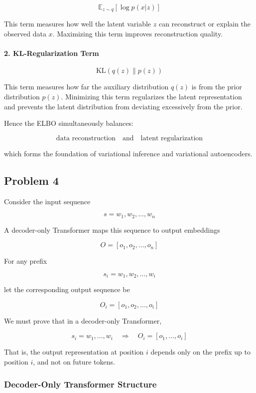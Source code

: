 \documentclass[12pt]{article}
\begin{document}
\[
\mathbb E_{z\sim q}[\log p(x|z)]
\]

This term measures how well the latent variable \(z\) can reconstruct or explain the observed data \(x\).
Maximizing this term improves reconstruction quality.

\paragraph{2. KL-Regularization Term}

\[
\mathrm{KL}(q(z)\|p(z))
\]

This term measures how far the auxiliary distribution \(q(z)\) is from the prior distribution \(p(z)\).
Minimizing this term regularizes the latent representation and prevents the latent distribution from deviating excessively from the prior.

Hence the ELBO simultaneously balances:

\[
\text{data reconstruction}
\quad \text{and} \quad
\text{latent regularization}
\]

which forms the foundation of variational inference and variational autoencoders.

\subsection*{Problem 4}

Consider the input sequence

\[
s = w_1,w_2,\dots,w_n
\]

A decoder-only Transformer maps this sequence to output embeddings

\[
O = [o_1,o_2,\dots,o_n]
\]

For any prefix

\[
s_i = w_1,w_2,\dots,w_i
\]

let the corresponding output sequence be

\[
O_i = [o_1,o_2,\dots,o_i]
\]

We must prove that in a decoder-only Transformer,

\[
s_i = w_1,\dots,w_i
\quad \Longrightarrow \quad
O_i = [o_1,\dots,o_i]
\]

That is, the output representation at position \(i\) depends only on the prefix up to position \(i\), and not on future tokens.

\subsubsection*{Decoder-Only Transformer Structure}
\end{document}
